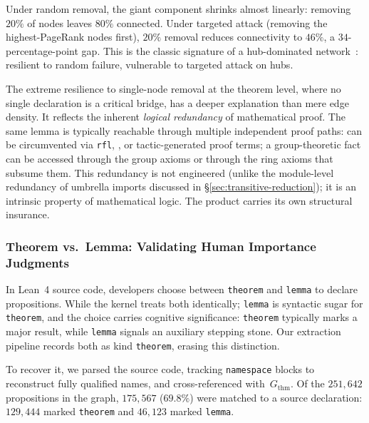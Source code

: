 Under random removal, the giant component shrinks almost linearly: removing $20\%$ of nodes leaves $80\%$ connected. Under targeted attack (removing the highest-PageRank nodes first), $20\%$ removal reduces connectivity to $46\%$, a $34$-percentage-point gap. This is the classic signature of a hub-dominated network~\cite{albert2000,barabasi1999}: resilient to random failure, vulnerable to targeted attack on hubs.

\label{rem:thm-robustness-redundancy}
The extreme resilience to single-node removal at the theorem level, where no single declaration is a critical bridge, has a deeper explanation than mere edge density. It reflects the inherent \emph{logical redundancy} of mathematical proof. The same lemma is typically reachable through multiple independent proof paths:  can be circumvented via \texttt{rfl}, , or tactic-generated proof terms; a group-theoretic fact can be accessed through the group axioms or through the ring axioms that subsume them. This redundancy is not engineered (unlike the module-level redundancy of umbrella imports discussed in \S\ref{sec:transitive-reduction}); it is an intrinsic property of mathematical logic. The product carries its own structural insurance.

\subsubsection{Theorem vs.\ Lemma: Validating Human Importance Judgments}
\label{sec:thm-vs-lemma}

In Lean~4 source code, developers choose between \texttt{theorem} and \texttt{lemma} to declare propositions. While the kernel treats both identically; \texttt{lemma} is syntactic sugar for \texttt{theorem}, and the choice carries cognitive significance: \texttt{theorem} typically marks a major result, while \texttt{lemma} signals an auxiliary stepping stone. Our extraction pipeline records both as kind \texttt{theorem}, erasing this distinction.

To recover it, we parsed the  source code, tracking \texttt{namespace} blocks to reconstruct fully qualified names, and cross-referenced with~$G_{\mathrm{thm}}$. Of the $251{,}642$ propositions in the graph, $175{,}567$ ($69.8\%$) were matched to a source declaration: $129{,}444$ marked \texttt{theorem} and $46{,}123$ marked \texttt{lemma}.

